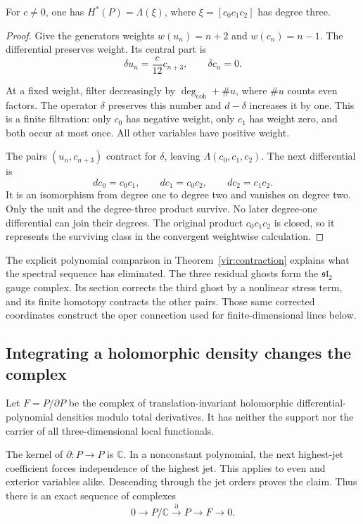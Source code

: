 \begin{proposition}\label{pcsm:vircohom}
For \(c\ne0\), one has \(H^*(P)=\Lambda(\xi)\), where
\(\xi=[c_0c_1c_2]\) has degree three.
\end{proposition}

\begin{proof}
Give the generators weights \(w(u_n)=n+2\) and \(w(c_n)=n-1\).
The differential preserves weight. Its central part is
\[
 \delta u_n=\frac c{12}c_{n+3},\qquad \delta c_n=0.
\]

At a fixed weight, filter decreasingly by
\(\deg_{\mathrm{coh}}+\#u\), where \(\#u\) counts even
factors. The operator \(\delta\) preserves this number and
\(d-\delta\) increases it by one.
This is a finite filtration: only \(c_0\) has negative weight,
only \(c_1\) has weight zero, and both occur at most once.
All other variables have positive weight.

The pairs \((u_n,c_{n+3})\) contract for \(\delta\), leaving
\(\Lambda(c_0,c_1,c_2)\).
The next differential is
\[
 dc_0=c_0c_1,\qquad dc_1=c_0c_2,\qquad dc_2=c_1c_2.
\]
It is an isomorphism from degree one to degree two and vanishes
on degree two. Only the unit and the degree-three product survive.
No later degree-one differential can join their degrees.
The original product \(c_0c_1c_2\) is closed, so it represents
the surviving class in the convergent weightwise calculation.
\end{proof}

The explicit polynomial comparison in
Theorem~\ref{vir:contraction} explains what the spectral sequence
has eliminated. The three residual ghosts form the
\(\mathfrak{sl}_2\) gauge complex. Its section corrects the third
ghost by a nonlinear stress term, and its finite homotopy contracts
the other pairs. Those same corrected coordinates construct the
oper connection used for finite-dimensional lines below.

\subsection{Integrating a holomorphic density changes the complex}

Let\label{pcsm:def:integrated-density-complex} \(F=P/\partial P\) be the complex of translation-invariant
holomorphic differential-polynomial densities modulo total derivatives.
It has neither the support nor the carrier of all three-dimensional
local functionals.

The kernel of \(\partial:P\to P\) is \(\mathbb C\).
In a nonconstant polynomial, the next highest-jet coefficient
forces independence of the highest jet.
This applies to even and exterior variables alike. Descending through the jet orders proves the claim.
Thus there is an exact sequence of complexes
\[
 0\longrightarrow P/\mathbb C\xrightarrow{\partial}P
                 \longrightarrow F\longrightarrow0.
\]

